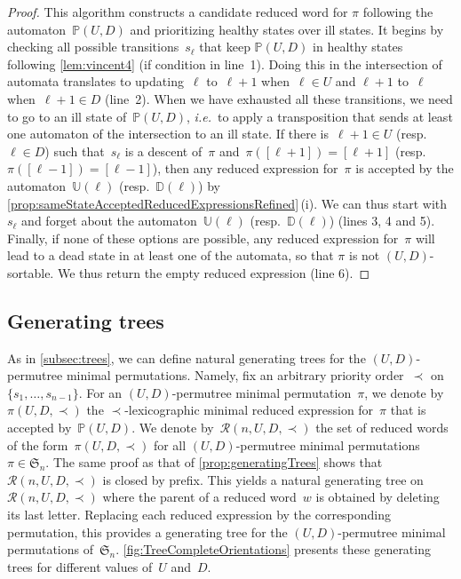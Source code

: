 \documentclass{amsart}
\newcommand{\fS}{\mathfrak{S}} %
\newcommand{\ie}{\textit{i.e.}~} %
\newcommand{\automatonP}{\mathbb{P}} %
\newcommand{\automatonU}{\mathbb{U}} %
\newcommand{\automatonD}{\mathbb{D}} %
\newcommand{\lexmin}{\mathcal{R}} %
\begin{document}
\begin{proof}
This algorithm constructs a candidate reduced word for $\pi$ following the automaton~$\automatonP(U,D)$ and prioritizing healthy states over ill states. 
It begins by checking all possible transitions~$s_\ell$ that keep $\automatonP(U,D)$ in healthy states following \cref{lem:vincent4} (if condition in line~1).
Doing this in the intersection of automata translates to updating~$\ell$ to~$\ell+1$ when~$\ell \in U$ and $\ell+1$ to~$\ell$ when~$\ell+1 \in D$ (line~2).
When we have exhausted all these transitions, we need to go to an ill state of~$\automatonP(U,D)$, \ie to apply a transposition that sends at least one automaton of the intersection to an ill state.
If there is~$\ell+1 \in U$ (resp.~$\ell \in D$) such that~$s_\ell$ is a descent of~$\pi$ and~$\pi([\ell+1]) = [\ell+1]$ (resp.~$\pi([\ell-1]) = [\ell-1]$), then any reduced expression for~$\pi$ is accepted by the automaton~$\automatonU(\ell)$ (resp.~$\automatonD(\ell)$) by \cref{prop:sameStateAcceptedReducedExpressionsRefined}\,(i). 
We can thus start with~$s_\ell$ and forget about the automaton~$\automatonU(\ell)$ (resp.~$\automatonD(\ell)$) (lines 3, 4 and 5).
Finally, if none of these options are possible, any reduced expression for~$\pi$ will lead to a dead state in at least one of the automata, so that $\pi$ is not $(U,D)$-sortable.
We thus return the empty reduced expression (line 6).
\end{proof}

\subsection{Generating trees}

As in \cref{subsec:trees}, we can define natural generating trees for the $(U,D)$-permutree minimal permutations.
Namely, fix an arbitrary priority order~$\prec$ on~$\{s_1, \dots, s_{n-1}\}$.
For an $(U,D)$-permutree minimal permutation~$\pi$, we denote by~$\pi(U, D, \prec)$ the $\prec$-lexicographic minimal reduced expression for~$\pi$ that is accepted by~$\automatonP(U,D)$.
We denote by~$\lexmin(n, U, D, \prec)$ the set of reduced words of the form~$\pi(U, D, \prec)$ for all $(U,D)$-permutree minimal permutations~$\pi \in \fS_n$.
The same proof as that of \cref{prop:generatingTrees} shows that $\lexmin(n, U, D, \prec)$ is closed by prefix.
This yields a natural generating tree on~$\lexmin(n, U, D, \prec)$ where the parent of a reduced word~$w$ is obtained by deleting its last letter.
Replacing each reduced expression by the corresponding permutation, this provides a generating tree for the $(U,D)$-permutree minimal permutations of~$\fS_n$.
\cref{fig:TreeCompleteOrientations} presents these generating trees for different values of~$U$ and~$D$.
\end{document}
